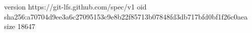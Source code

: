 version https://git-lfs.github.com/spec/v1
oid sha256:a70704d9ee3a6c27095153c9e8b22f85713b07848fd3db717bfd0bf1f26c0aea
size 18647
